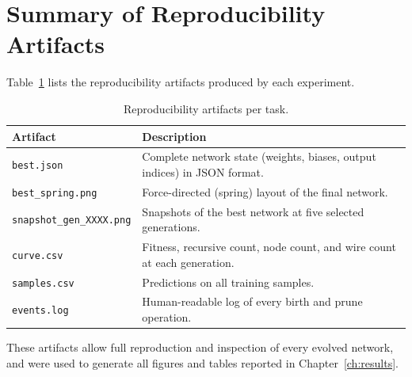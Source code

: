 \section{Summary of Reproducibility Artifacts}
\label{sec:exp-artifacts}

Table~\ref{tab:artifacts} lists the reproducibility artifacts
produced by each experiment.

\begin{table}[h]
  \centering
  \small
  \caption{Reproducibility artifacts per task.}
  \label{tab:artifacts}
  \begin{tabular}{lp{9cm}}
    \toprule
    \textbf{Artifact} & \textbf{Description} \\
    \midrule
    \texttt{best.json}         & Complete network state (weights,
      biases, output indices) in JSON format. \\
    \texttt{best\_spring.png}  & Force-directed (spring) layout of
      the final network. \\
    \texttt{snapshot\_gen\_XXXX.png} & Snapshots of the best network
      at five selected generations. \\
    \texttt{curve.csv}         & Fitness, recursive count, node count,
      and wire count at each generation. \\
    \texttt{samples.csv}       & Predictions on all training samples. \\
    \texttt{events.log}        & Human-readable log of every birth and
      prune operation. \\
    \bottomrule
  \end{tabular}
\end{table}

These artifacts allow full reproduction and inspection of every
evolved network, and were used to generate all figures and tables
reported in Chapter~\ref{ch:results}.

